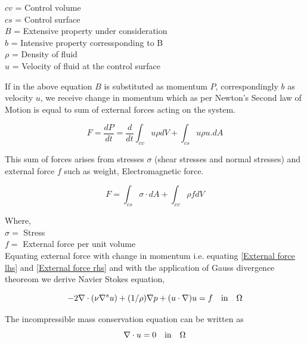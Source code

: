 \documentclass[a4paper,10pt]{book}
\begin{document}
\begin{center}
$cv$ = Control volume\\
$cs$ = Control surface\\
$B$ = Extensive property under consideration  \\
$b$ = Intensive property corressponding to B \\
$\rho$ = Density of fluid \\
$u$ = Velocity of fluid at the control surface \\
\end{center}

If in the above equation $B$ is substituted as momentum $P$, correspondingly $b$ as velocity $u$, we receive change in momentum which as per Newton's Second law of Motion is equal to sum of external forces acting on the system. 

\begin{equation}\label{External force lhs}
F = \frac{dP}{dt} = \frac{d}{dt} \int_{cv} u \rho dV + \int_{cs} u \rho u.dA 
\end{equation}

This sum of forces arises from stresses $\sigma$ (shear stresses and normal stresses) and external force $f$ such as weight, Electromagnetic force. 

\begin{equation}\label{External force rhs}
F = \int_{cs} \sigma \cdot dA + \int_{cv} \rho f dV
\end{equation}

Where,\\
$\sigma =$ Stress\\
$f =$ External force per unit volume\\

Equating external force with change in momentum i.e. equating \eqref{External force lhs} and \eqref{External force rhs} and with the application of Gauss divergence theoreom we derive Navier Stokes equation, 

\begin{equation} \label{navier_stokes}
-2\nabla \cdot (\nu \nabla^s u) + (1/\rho) \nabla p + (u \cdot \nabla)u = f \quad   \textnormal{in}  \quad \Omega
\end{equation} 

The incompressible mass conservation equation can be written as
\begin{equation}\label{mass_conservation}
\nabla \cdot u=0 \quad   \textnormal{in}  \quad \Omega
\end{equation}
\end{document}
